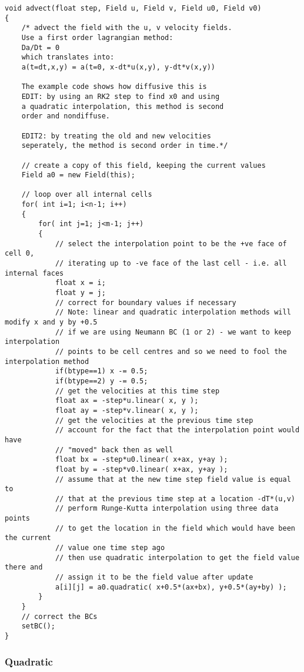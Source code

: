 \documentclass[notitlepage]{article}
\begin{document}
\begin{lstlisting}[style=myCpp]
void advect(float step, Field u, Field v, Field u0, Field v0)
{
	/* advect the field with the u, v velocity fields.
	Use a first order lagrangian method:
	Da/Dt = 0
	which translates into:
	a(t=dt,x,y) = a(t=0, x-dt*u(x,y), y-dt*v(x,y))
	
	The example code shows how diffusive this is 
	EDIT: by using an RK2 step to find x0 and using
	a quadratic interpolation, this method is second
	order and nondiffuse.
	
	EDIT2: by treating the old and new velocities 
	seperately, the method is second order in time.*/
	
	// create a copy of this field, keeping the current values
	Field a0 = new Field(this);
	
	// loop over all internal cells
	for( int i=1; i<n-1; i++)
	{
		for( int j=1; j<m-1; j++)
		{
			// select the interpolation point to be the +ve face of cell 0,
			// iterating up to -ve face of the last cell - i.e. all internal faces
			float x = i;
			float y = j;
			// correct for boundary values if necessary
			// Note: linear and quadratic interpolation methods will modify x and y by +0.5
			// if we are using Neumann BC (1 or 2) - we want to keep interpolation
			// points to be cell centres and so we need to fool the interpolation method
			if(btype==1) x -= 0.5;
			if(btype==2) y -= 0.5;
			// get the velocities at this time step
			float ax = -step*u.linear( x, y );
			float ay = -step*v.linear( x, y );
			// get the velocities at the previous time step
			// account for the fact that the interpolation point would have
			// "moved" back then as well
			float bx = -step*u0.linear( x+ax, y+ay );
			float by = -step*v0.linear( x+ax, y+ay );
			// assume that at the new time step field value is equal to
			// that at the previous time step at a location -dT*(u,v)
			// perform Runge-Kutta interpolation using three data points
			// to get the location in the field which would have been the current
			// value one time step ago
			// then use quadratic interpolation to get the field value there and
			// assign it to be the field value after update
			a[i][j] = a0.quadratic( x+0.5*(ax+bx), y+0.5*(ay+by) );
		}
	}
	// correct the BCs
	setBC();
}
\end{lstlisting}

\subsubsection{Quadratic}
\end{document}
